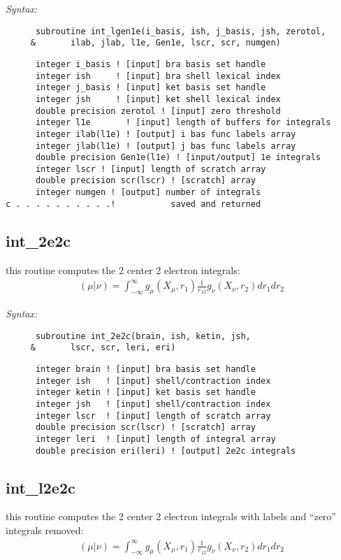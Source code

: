 {\it Syntax:} 
\begin{verbatim} 
      subroutine int_lgen1e(i_basis, ish, j_basis, jsh, zerotol, 
     &       ilab, jlab, l1e, Gen1e, lscr, scr, numgen)  
\end{verbatim} 
\begin{verbatim} 
      integer i_basis ! [input] bra basis set handle 
      integer ish     ! [input] bra shell lexical index 
      integer j_basis ! [input] ket basis set handle 
      integer jsh     ! [input] ket shell lexical index 
      double precision zerotol ! [input] zero threshold 
      integer l1e       ! [input] length of buffers for integrals 
      integer ilab(l1e) ! [output] i bas func labels array 
      integer jlab(l1e) ! [output] j bas func labels array 
      double precision Gen1e(l1e) ! [input/output] 1e integrals 
      integer lscr ! [input] length of scratch array 
      double precision scr(lscr) ! [scratch] array 
      integer numgen ! [output] number of integrals  
c . . . . . . . . . .!           saved and returned 
\end{verbatim} 
\subsection{int\_2e2c} 
this routine computes the 2 center 2 electron integrals:  
\begin{eqnarray*} 
({\mu}|{\nu}) = \int_{-\infty}^{\infty} g_{\mu}(X_{\mu},r_{1})\frac{1}{r_{12}}g_{\nu}(X_{\nu},r_{2})dr_{1}dr_{2} 
\end{eqnarray*} 
 
{\it Syntax:} 
\begin{verbatim} 
      subroutine int_2e2c(brain, ish, ketin, jsh,  
     &       lscr, scr, leri, eri) 
\end{verbatim} 
\begin{verbatim} 
      integer brain ! [input] bra basis set handle 
      integer ish   ! [input] shell/contraction index 
      integer ketin ! [input] ket basis set handle 
      integer jsh   ! [input] shell/contraction index 
      integer lscr  ! [input] length of scratch array 
      double precision scr(lscr) ! [scratch] array 
      integer leri  ! [input] length of integral array 
      double precision eri(leri) ! [output] 2e2c integrals 
\end{verbatim} 
\subsection{int\_l2e2c} 
this routine computes the 2 center 2 electron integrals 
with labels and ``zero'' integrals removed:  
\begin{eqnarray*} 
({\mu}|{\nu}) = \int_{-\infty}^{\infty} g_{\mu}(X_{\mu},r_{1})\frac{1}{r_{12}}g_{\nu}(X_{\nu},r_{2})dr_{1}dr_{2} 
\end{eqnarray*} 
 
